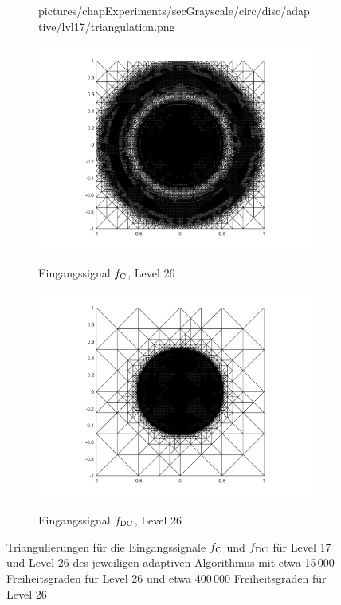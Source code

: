 \begin{figure}[p]
\begin{subfigure}[b]{.48\linewidth}
      {pictures/chapExperiments/secGrayscale/circ/disc/adaptive/lvl17/triangulation.png}
    \label{fig:circDiscLvl17Triang}
  \end{subfigure}

  \begin{subfigure}[b]{.48\linewidth}
    \centering
    \caption{Eingangssignal $f_\textup{C}$, Level 26}
    \includegraphics[trim = 100 30 80 20, clip, width=\linewidth]
      {pictures/chapExperiments/secGrayscale/circ/cont/adaptive/lvl26/triangulation.png}
    \label{fig:circContFinalTriang}
  \end{subfigure}
  \quad
  \begin{subfigure}[b]{.48\linewidth}
    \centering
    \caption{Eingangssignal $f_\textup{DC}$, Level 26}
    \includegraphics[trim = 100 30 80 20, clip, width=\linewidth]
      {pictures/chapExperiments/secGrayscale/circ/disc/adaptive/lvl26/triangulation.png}
    \label{fig:circDiscFinalTriang}
  \end{subfigure}
  \caption{Triangulierungen für die Eingangssignale $f_\textup{C}$ und
  $f_\textup{DC}$ für Level 17 und Level 26 des jeweiligen adaptiven
  Algorithmus mit etwa 15\,000 Freiheitsgraden für Level 26 und etwa 400\,000
  Freiheitsgraden für Level 26}
  \label{fig:circleTriang}
\end{figure}
